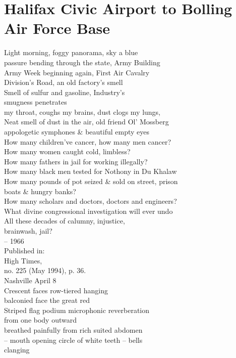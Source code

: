 \documentclass[smalldemyvopaper,11pt,twoside,onecolumn,openright,extrafontsizes]{memoir}
\begin{document}
\chapter{Halifax Civic Airport to Bolling Air Force Base}
Light morning, foggy panorama, sky a blue
\\passure bending through the state, Army Building
\\Army Week beginning again, First Air Cavalry
\\Division's Road, an old factory's smell
\\Smell of sulfur and gasoline, Industry's
\\smugness penetrates
\\my throat, coughs my brains, dust clogs my lungs,
\\Neat smell of dust in the air, old friend Ol' Mossberg
\\appologetic symphones \& beautiful empty eyes
\\How many children've cancer, how many men cancer?
\\How many women caught cold, limbless?
\\How many fathers in jail for working illegally?
\\How many black men tested for Nothony in Du Khalaw
\\How many pounds of pot seized \& sold on street, prison
\\boats \& hungry banks?
\\How many scholars and doctors, doctors and engineers?
\\What divine congressional investigation will ever undo
\\All these decades of calumny, injustice,
\\brainwash, jail?
\\-- 1966
\\Published in:
\\High Times,
\\no. 225 (May 1994), p. 36.
\\Nashville April 8
\\Crescent faces row-tiered hanging
\\balconied face the great red
\\Striped flag podium microphonic reverberation
\\from one body outward
\\breathed painfully from rich suited abdomen
\\-- mouth opening circle of white teeth -- bells
\\clanging
\end{document}
